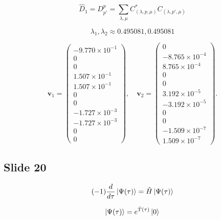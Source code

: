 \documentclass[a4paper,11pt]{article}
\begin{document}
\begin{equation}
\hat{D}_{1} = D^{p}_{p'} = \sum_{\lambda, \mu} C^*_{(\lambda, p, \mu)} C_{(\lambda, p', \mu)}
\end{equation}

\begin{equation}
\lambda_1, \lambda_2 \approx 0.495081, 0.495081
\end{equation}

\begin{equation}
\mathbf{v}_1 =
\begin{pmatrix}
-9.770\times 10^{-1} \\
 0 \\
 0 \\
 1.507\times 10^{-1} \\
 1.507\times 10^{-1} \\
 0 \\
 0 \\
-1.727\times 10^{-3} \\
-1.727\times 10^{-3} \\
 0 \\
 0
\end{pmatrix},
\quad
\mathbf{v}_2 =
\begin{pmatrix}
 0 \\
-8.765\times 10^{-4} \\
 8.765\times 10^{-4} \\
 0 \\
 0 \\
 3.192\times 10^{-5} \\
-3.192\times 10^{-5} \\
 0 \\
 0 \\
-1.509\times 10^{-7} \\
 1.509\times 10^{-7}
\end{pmatrix}.
\end{equation}

\subsection*{Slide 20}

\begin{equation}
(-1) \frac{d}{d \tau} \ket{\Psi(\tau)}= \hat{H}\ket{\boldmath{\Psi}(\tau)}
\end{equation}

\begin{equation}
\ket{\Psi(\tau)}= e^{\hat{T}(\tau)}\ket{0}
\end{equation}
\end{document}
